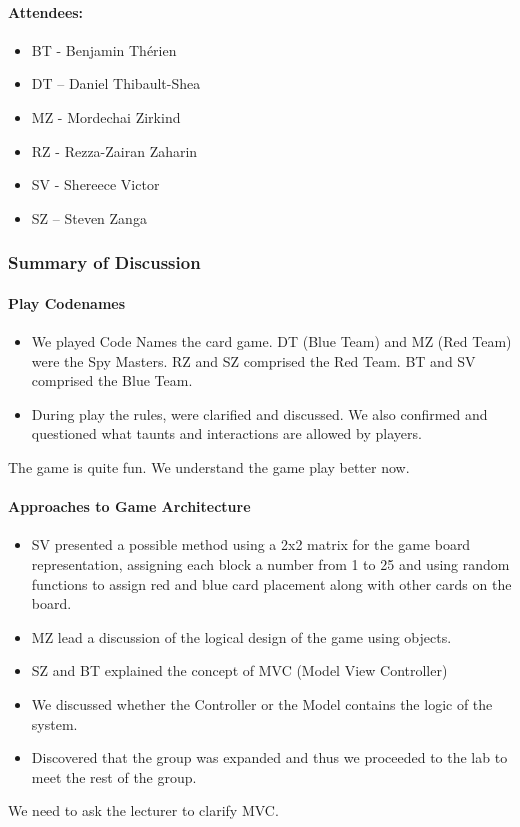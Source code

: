 \documentclass[10pt, a4paper]{article}
\begin{document}
			\paragraph{Attendees:}
			\begin{itemize}
				\item BT - Benjamin Th\'erien
				\item DT – Daniel Thibault-Shea
				\item MZ - Mordechai Zirkind 
				\item RZ - Rezza-Zairan Zaharin
				\item SV - Shereece Victor
				\item SZ – Steven Zanga
			\end{itemize}
			
			\subsubsection{Summary of Discussion }
			\paragraph{Play Codenames }
			\begin{itemize}
				\item We played Code Names the card game. DT (Blue Team) and MZ (Red Team) were the Spy Masters. RZ and SZ comprised the Red Team. BT and SV comprised the Blue Team. 
				\item During play the rules, were clarified and discussed. We also confirmed and questioned what taunts and interactions are allowed by players.   
			\end{itemize}
			The game is quite fun. We understand the game play better now. 
			
			\paragraph{Approaches to Game Architecture  }
			\begin{itemize}
				\item SV presented a possible method using a 2x2 matrix for the game board representation, assigning each block a number from 1 to 25 and using random functions to assign red and blue card placement along with other cards on the board. 
				\item MZ lead a discussion of the logical design of the game using objects.
				\item SZ and BT explained the concept of MVC (Model View Controller)
				\item We discussed whether the Controller or the Model contains the logic of the system.
				\item Discovered that the group was expanded and thus we proceeded to the lab to meet the rest of the group. 
			\end{itemize}
			We need to ask the lecturer to clarify MVC. 
			
\end{document}
